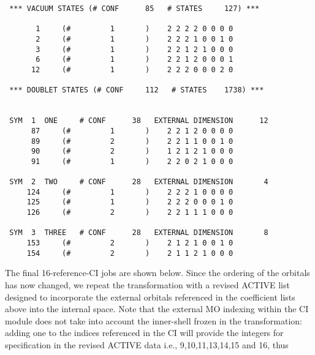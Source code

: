 \documentclass[11pt,fleqn]{article}
\begin{document}
{
\footnotesize
\begin{verbatim}
 *** VACUUM STATES (# CONF      85   # STATES     127) ***

       1     (#         1       )    2 2 2 2 0 0 0 0
       2     (#         1       )    2 2 2 1 0 0 1 0
       3     (#         1       )    2 2 1 2 1 0 0 0
       6     (#         1       )    2 2 1 2 0 0 0 1
      12     (#         1       )    2 2 2 0 0 0 2 0

 *** DOUBLET STATES (# CONF     112   # STATES    1738) ***


 SYM  1  ONE     # CONF      38   EXTERNAL DIMENSION      12
      87     (#         1       )    2 2 1 2 0 0 0 0
      89     (#         2       )    2 2 1 1 0 0 1 0
      90     (#         2       )    1 2 1 2 1 0 0 0
      91     (#         1       )    2 2 0 2 1 0 0 0

 SYM  2  TWO     # CONF      28   EXTERNAL DIMENSION       4
     124     (#         1       )    2 2 2 1 0 0 0 0
     125     (#         1       )    2 2 2 0 0 0 1 0
     126     (#         2       )    2 2 1 1 1 0 0 0

 SYM  3  THREE   # CONF      28   EXTERNAL DIMENSION       8
     153     (#         2       )    2 1 2 1 0 0 1 0
     154     (#         2       )    2 1 1 2 1 0 0 0
\end{verbatim}
}
The final 16-reference-CI jobs are shown below. Since the ordering of the
orbitals has now changed, we repeat the transformation with a revised
ACTIVE list designed to incorporate the external orbitals referenced
in the coefficient lists above into the internal space. Note that the
external MO indexing within the CI module does not take into account
the inner-shell frozen in the transformation: adding one to the indices
referenced in the CI will provide the integers for specification in the
revised ACTIVE data i.e., 9,10,11,13,14,15 and 16, thus
\end{document}
